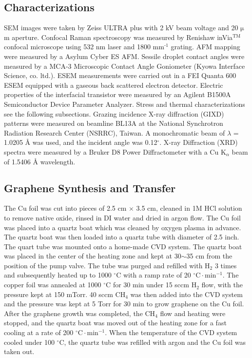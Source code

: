 \subsection{Characterizations}
\label{sec:small-org048d24a}
SEM images were taken by Zeiss ULTRA plus with 2 kV beam voltage
and 20 \(\mathrm{\mu}\)m aperture. Confocal Raman spectroscopy was
measured by Renishaw inVia\(^{\textrm{TM}}\) confocal microscope using
532 nm laser and 1800 mm\(^{\text{-1}}\) grating. AFM mapping were measured by
a Asylum Cyber ES AFM. Sessile droplet contact angles were measured
by a MCA-3 Microscopic Contact Angle Goniometer (Kyowa Interface
Science, co. ltd.). ESEM measurements were carried out in a FEI
Quanta 600 ESEM equipped with a gaseous back scattered electron
detector. Electric properties of the interfacial transistor were
measured by an Agilent B1500A Semiconductor Device Parameter
Analyzer. Stress and thermal characterizations see the following
subsections. Grazing incidence X-ray diffraction (GIXD) patterns
were measured on beamline BL13A at the National Synchrotron
Radiation Research Center (NSRRC), Taiwan. A monochromatic beam of
\(\lambda\) = 1.0205 \AA{} was used, and the incident angle was
0.12\(^{\circ}\). X-ray Diffraction (XRD) spectra were measured by
a Bruker D8 Power Diffractometer with a Cu K\(_{\alpha}\) beam of
1.5406 \AA{} wavelength.

\subsection{Graphene Synthesis and Transfer}
\label{sec:small-org7dad228}

The Cu foil was cut into pieces of 2.5 cm \(\times\) 3.5 cm, cleaned in 1M
HCl solution to remove native oxide, rinsed in DI water and dried in
argon flow. The Cu foil was placed into a quartz boat which was
cleaned by oxygen plasma in advance. The quartz boat was then loaded
into a quartz tube with diameter of 2.5 inch. The quart tube was
mounted onto a home-made CVD system. The quartz boat was placed in the
center of the heating zone and kept at 30\(\sim\)35 cm from the position of
the pump valve. The tube was purged and refilled with H\(_{\text{2}}\) 3 times
and subsequently heated up to 1000 \(^\circ \mathrm{C}\) with a ramp
rate of 20 \(^{\circ}\mathrm{C} \cdot \mathrm{min}^{-1}\). The copper
foil was annealed at 1000 \(^\circ \mathrm{C}\) for 30 min under 15 sccm
H\(_{\text{2}}\) flow, with the pressure kept at 150 mTorr. 40 sccm CH\(_{\text{4}}\) was
then added into the CVD system and the pressure was kept at 5 Torr for
30 min to grow graphene on the Cu foil. After the graphene growth
was completed, the CH\(_{\text{4}}\) flow and heating were stopped, and the quartz
boat was moved out of the heating zone for a fast cooling at a rate of
200 \(^{\circ}\mathrm{C} \cdot \mathrm{min}^{-1}\). When the temperature
of the CVD system cooled under 100 \(^{\circ}\mathrm{C}\), the quartz tube
was refilled with argon and the Cu foil was taken out.

